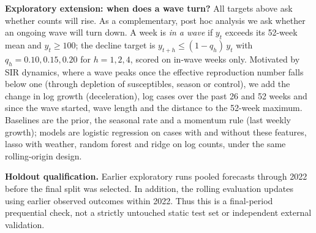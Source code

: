 \textbf{Exploratory extension: when does a wave turn?} All targets above ask whether counts
will rise. As a complementary, post hoc analysis we ask whether an ongoing wave will turn down.
A week is \emph{in a wave} if $y_t$ exceeds its 52-week mean and $y_t\ge100$; the decline target
is $y_{t+h}\le(1-q_h)\,y_t$ with $q_h=0.10,0.15,0.20$ for $h=1,2,4$, scored on in-wave weeks
only. Motivated by SIR dynamics, where a wave peaks once the effective reproduction number
falls below one (through depletion of susceptibles, season or control), we add the change in
log growth (deceleration), log cases over the past 26 and 52 weeks and since the wave started,
wave length and the distance to the 52-week maximum. Baselines are the prior, the seasonal rate
and a momentum rule (last weekly growth); models are logistic regression on cases with and
without these features, lasso with weather, random forest and ridge on log counts, under the
same rolling-origin design.

\textbf{Holdout qualification.} Earlier exploratory runs pooled forecasts through 2022
before the final split was selected. In addition, the rolling evaluation updates using
earlier observed outcomes within 2022. Thus this is a final-period prequential check,
not a strictly untouched static test set or independent external validation.
